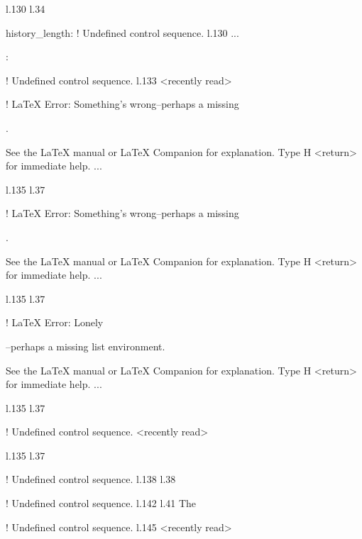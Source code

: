{{{{{{{{{{{{{{{{{{l.130 l.34     \item \xmlNode
                             {history\_length}: \xmlDesc
! Undefined control sequence.
l.130 ...\item {}: \xmlDesc
                                                  
! Undefined control sequence.
l.133 <recently read> \xmlNode
                              

! LaTeX Error: Something's wrong--perhaps a missing \item.

See the LaTeX manual or LaTeX Companion for explanation.
Type  H <return>  for immediate help.
 ...                                              
                                                  
l.135 l.37     \item \xmlNode
                             

! LaTeX Error: Something's wrong--perhaps a missing \item.

See the LaTeX manual or LaTeX Companion for explanation.
Type  H <return>  for immediate help.
 ...                                              
                                                  
l.135 l.37     \item \xmlNode
                             

! LaTeX Error: Lonely \item--perhaps a missing list environment.

See the LaTeX manual or LaTeX Companion for explanation.
Type  H <return>  for immediate help.
 ...                                              
                                                  
l.135 l.37     \item \xmlNode
                             
! Undefined control sequence.
<recently read> \xmlNode 
                         
l.135 l.37     \item \xmlNode
                             
! Undefined control sequence.
l.138 l.38       \xmlNode
                         
! Undefined control sequence.
l.142 l.41       The \xmlNode
                             
! Undefined control sequence.
l.145 <recently read> \xmlNode
                              

}}}}}}}}}}}}}}}}}}
